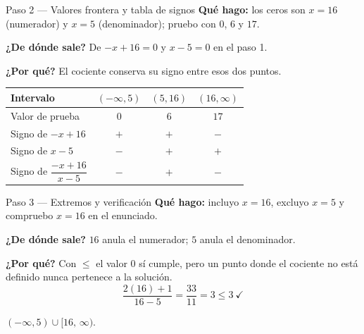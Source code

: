 \documentclass[11pt]{article}
\begin{document}
\begin{paso}{Paso 2 --- Valores frontera y tabla de signos}
\textbf{Qué hago:} los ceros son $x=16$ (numerador) y $x=5$ (denominador); pruebo con $0$, $6$ y $17$.

\textbf{¿De dónde sale?} De $-x+16=0$ y $x-5=0$ en el paso 1.

\textbf{¿Por qué?} El cociente conserva su signo entre esos dos puntos.

\begin{center}
\begin{tabular}{|l|c|c|c|}
\hline
Intervalo & $(-\infty,5)$ & $(5,16)$ & $(16,\infty)$ \\
\hline
Valor de prueba & $0$ & $6$ & $17$ \\
Signo de $-x+16$ & $+$ & $+$ & $-$ \\
Signo de $x-5$ & $-$ & $+$ & $+$ \\
\hline
Signo de $\dfrac{-x+16}{x-5}$ & $-$ & $+$ & $-$ \\
\hline
\end{tabular}
\end{center}
\end{paso}

\begin{paso}{Paso 3 --- Extremos y verificación}
\textbf{Qué hago:} incluyo $x=16$, excluyo $x=5$ y compruebo $x=16$ en el enunciado.

\textbf{¿De dónde sale?} $16$ anula el numerador; $5$ anula el denominador.

\textbf{¿Por qué?} Con $\le$ el valor $0$ sí cumple, pero un punto donde el cociente no está definido nunca pertenece a la solución.
\[
\frac{2(16)+1}{16-5}=\frac{33}{11}=3\le 3 \ \checkmark
\]
\end{paso}

\begin{center}
\end{center}

\begin{resp}
$(-\infty,5)\cup[16,\,\infty)$.
\end{resp}
\end{document}
